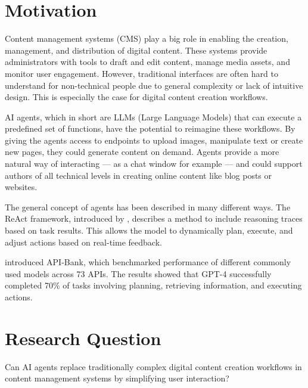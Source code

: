 \documentclass[12pt,a4paper]{article}
\title{\titlename}
\author{ \authorname\\ \scriptsize \authormail \\ \scriptsize \address }
\date{\exposedate}
\begin{document}

\maketitle

\section*{Motivation}
Content management systems (CMS) play a big role in enabling the creation, management, and distribution of digital content. These systems provide administrators with tools to draft and edit content, manage media assets, and monitor user engagement.
However, traditional interfaces are often hard to understand for non-technical people due to general complexity or lack of intuitive design. This is especially the case for digital content creation workflows.

AI agents, which in short are LLMs (Large Language Models) that can execute a predefined set of functions, have the potential to reimagine these workflows.
By giving the agents access to endpoints to upload images, manipulate text or create new pages, they could generate content on demand.
Agents provide a more natural way of interacting — as a chat window for example — and could support authors of all technical levels in creating online content like blog posts or websites.

The general concept of agents has been described in many different ways. The ReAct framework, introduced by \cite{yao_react_2023}, describes a method to include reasoning traces based on task results. This allows the model to dynamically plan, execute, and adjust actions based on real-time feedback.

\cite{li_api-bank_2023} introduced API-Bank, which benchmarked performance of different commonly used models across 73 APIs. The results showed that GPT-4 \autocite{openai_gpt-4_2024} successfully completed 70\% of tasks involving planning, retrieving information, and executing actions.

\section*{Research Question}
Can AI agents replace traditionally complex digital content creation workflows in content management systems by simplifying user interaction?
\end{document}
